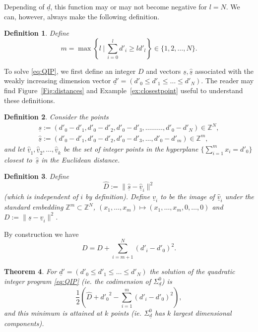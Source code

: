 \documentclass[a4paper]{amsart}
\newcommand{\Z}{\mathbb{Z}}
\newcommand{\us}{\underline{s}}
\newcommand{\ud}{\underline{d}}
\newcommand{\uv}{\underline{v}}
\newtheorem{thm}{Theorem}[section]
\newtheorem{defn}[thm]{Definition}
\theoremstyle{plain}
\begin{document}
Depending of $\ud$, this function may or may not become negative for $l=N$. We can, however, always make the following definition.

\begin{defn} \label{def:d1}
Define 
\[
m=\max \left\{l\ |\ \sum_{i=0}^l d'_i \geq l d'_l\right\} \in \{1,2,\ldots,N\}.
\]
\end{defn}

To solve \eqref{eq:QIP}, we first define an integer $D$ and vectors $\us, \hat{\us}$ associated with the weakly increasing dimension vector $\ud'=(d'_0\leq d'_1 \leq \ldots \leq d'_N)$. The reader may find Figure~\ref{Fig:distances} and Example~\ref{ex:closestpoint} useful to understand these definitions.

\begin{defn} \label{def:d2}
Consider the points
\[
\begin{array}{l}
    \us:=\left(d'_0-d'_1, d'_0-d'_2,d'_0-d'_3,\ldots\ldots\ldots,d'_0-d'_N \right) \in \Z^N,
    \\
    \hat{\us}:=\left(d'_0-d'_1, d'_0-d'_2,d'_0-d'_3,\ldots,d'_0-d'_m \right) \in \Z^m,
\end{array}
\]
and let $\hat{\uv}_1,\hat{\uv}_2,\ldots,\hat{\uv}_k$ be the set of integer points in the hyperplane $\{\sum_{i=1}^m x_i=d'_0\}$ closest to~$\hat{\us}$ in the Euclidean distance.
\end{defn}

\begin{defn}\label{def:d3}
    Define 
    \[\hat{D}:=\| \hat{\us}-\hat{\uv}_i \|^2\]
    (which is independent of $i$ by definition). Define $\uv_i$ to be the image of $\hat{\uv}_i$ under the standard embedding $\Z^m \subset \Z^N$, $(x_1,\ldots,x_m)\mapsto (x_1,\ldots,x_m,0,\ldots,0)$ and $D:=\| \us-\uv_i \|^2$.
\end{defn}

By construction we have
\begin{equation}\label{eqn:D_Dhat}
D=\hat{D}+\sum_{i=m+1}^N(d'_i-d'_0)^2.
\end{equation}



\begin{thm} \label{thm:QIPreduced2closestpoint}
    For $\ud'=(d'_0\leq d'_1 \leq \ldots\leq d'_N)$ the solution of the quadratic integer program \eqref{eq:QIP} (ie. the codimension of $\Sigma^0_{\ud}$) is  
     \begin{equation}\label{eq:gD}
    \frac{1}{2}\left( \hat{D} + {d'_0}^2 - \sum_{i=1}^m (d'_i-d'_0)^2  \right), 
    \end{equation}
    and this minimum is attained at $k$ points (ie. $\Sigma^0_{\ud}$ has $k$ largest dimensional components).
\end{thm}
\end{document}
